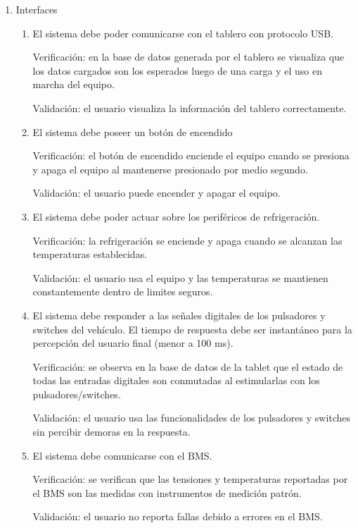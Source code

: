 \documentclass[
11pt, %
codirector, %
]{charter}
\begin{document}
\begin{enumerate}
	\item Interfaces
	      \begin{enumerate}
		      \item El sistema debe poder comunicarse con el tablero con protocolo USB.

		            Verificación: en la base de datos generada por el tablero se visualiza que los datos cargados son los esperados luego de una carga y el uso en marcha del equipo.

		            Validación: el usuario visualiza la información del tablero correctamente.

		      \item El sistema debe poseer un botón de encendido

		            Verificación: el botón de encendido enciende el equipo cuando se presiona y apaga el equipo al mantenerse presionado por medio segundo.

		            Validación: el usuario puede encender y apagar el equipo.
		      \item El sistema debe poder actuar sobre los periféricos de refrigeración.

		            Verificación: la refrigeración se enciende y apaga cuando se alcanzan las temperaturas establecidas.

		            Validación: el usuario usa el equipo y las temperaturas se mantienen constantemente dentro de limites seguros.

		      \item El sistema debe responder a las señales digitales de los pulsadores y switches del vehículo. El tiempo de respuesta debe ser instantáneo para la percepción del usuario final (menor a 100 ms).

		            Verificación: se observa en la base de datos de la tablet que el estado de todas las entradas digitales son conmutadas al estimularlas con los pulsadores/switches.

		            Validación: el usuario usa las funcionalidades de los pulsadores y switches sin percibir demoras en la respuesta.
		      \item El sistema debe comunicarse con el BMS.

		            Verificación: se verifican que las tensiones y temperaturas reportadas por el BMS son las medidas con instrumentos de medición patrón.

		            Validación: el usuario no reporta fallas debido a errores en el BMS.


\end{enumerate}
\end{enumerate}
\end{document}
